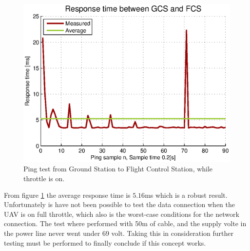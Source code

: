 \begin{figure}[hbtp]
\centering
\includegraphics[scale=1]{graphics/pingTest.eps}
\caption{Ping test from Ground Station to Flight Control Station, while throttle is on.}
\label{fig:pingTest}
\end{figure}

\noindent
From figure \ref{fig:pingTest} the average response time is $5.16$ms which is a robust result. Unfortunately is have not been possible to test the data connection when the UAV is on full throttle, which also is the worst-case conditions for the network connection. The test where performed with 50m of cable, and the supply volte in the power line never went under 69 volt. Taking this in consideration further testing must be performed to finally conclude if this concept works. 


